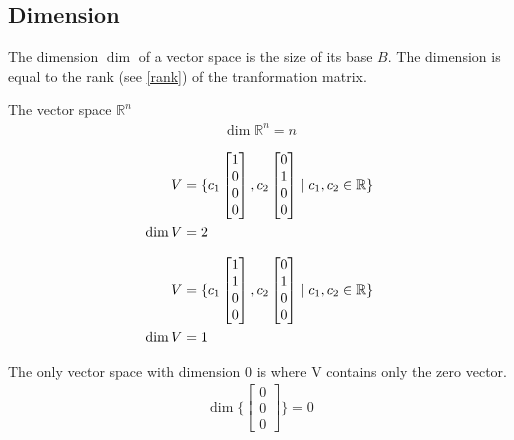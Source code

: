 \subsection{Dimension}\label{dimension}
The dimension \( \dim \) of a vector space is the size of its base \(B\). The dimension
is equal to the rank (see \ref{rank}) of the tranformation matrix.
\begin{example}
    The vector space \(\mathbb{R}^n\)
    \begin{align*}
        \dim \mathbb{R}^n = n
    \end{align*}
\end{example}
\begin{example}
    \begin{align*}
        V      & = \{
            c_1
            \begin{bmatrix}
                1 \\ 0 \\ 0 \\ 0
            \end{bmatrix},
            c_2
            \begin{bmatrix}
                0 \\ 1 \\ 0 \\ 0
            \end{bmatrix}
         \mid c_1, c_2 \in \mathbb{R} \} \\
        \dim V & = 2
    \end{align*}
\end{example}
\begin{example}
    \begin{align*}
        V      & = \{
            c_1
            \begin{bmatrix}
                1 \\ 1 \\ 0 \\ 0
            \end{bmatrix},
            c_2
            \begin{bmatrix}
                0 \\ 1 \\ 0 \\ 0
            \end{bmatrix}
         \mid c_1, c_2 \in \mathbb{R} \} \\
        \dim V & = 1
    \end{align*}
\end{example}
\begin{example}
    The only vector space with dimension 0 is where V contains only the zero vector.
    \begin{align*}
        \dim \{ \begin{bmatrix} 0 \\ 0 \\ 0 \end{bmatrix}\} = 0
    \end{align*}

\end{example}
